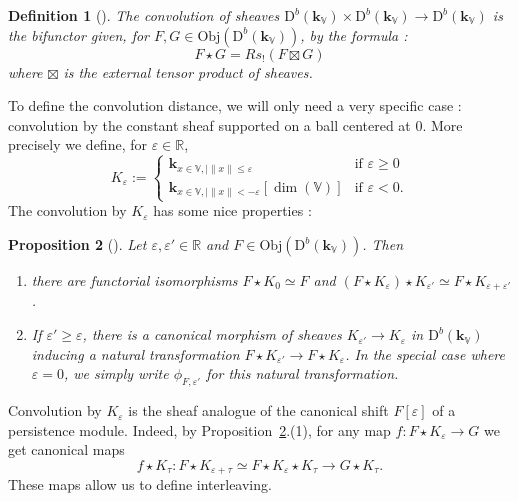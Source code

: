 \documentclass[a4paper, english, 11pt]{article}
\newcommand{\kk}[0]{\textbf{k}}
\newcommand{\0}{\vec{0}}
\newcommand{\R}[0]{\mathbb{R}}
\newcommand{\V}[0]{\mathbb{V}}
\newcommand{\D}[0]{\text{D}}
\newcommand{\Obj}[0]{\text{Obj}}
\newtheorem{prop}{Proposition}[section]
\newtheorem{defi}[prop]{Definition}
\begin{document}
\begin{defi}[\cite{KS18}]\label{D:Convolution} The convolution of sheaves  $\D^b(\kk_\V)\times \D^b(\kk_\V) \to \D^b(\kk_\V)$ is the bifunctor given, 
for $F,G\in \Obj(\D^b(\kk_\V))$,  by the formula : $$F\star G = R s_!(F\boxtimes G)$$ where $\boxtimes$ is the external tensor product of sheaves. 
\end{defi}
To define the convolution distance,  we will only need a very specific case :  convolution by the constant sheaf supported on a ball centered at 0. 
More precisely we define, for $\varepsilon \in \R$, 
\begin{equation}\label{eq:defKepsilon}
 K_\varepsilon :=  \left\{ \begin{array}{cc} 
 \kk_{x\in \V, \mid \|x\|\leq \varepsilon}  & \mbox{if } \varepsilon \geq 0 \\
 \kk_{x\in \V, \mid \|x\|< -\varepsilon}[\dim(\V)]  & \mbox{if } \varepsilon < 0 .\end{array} \right.
\end{equation}
The convolution by $K_\varepsilon$ has some nice properties : 
\begin{prop}[\cite{KS18}]\label{P:propertiesofconvolution} Let $\varepsilon, \varepsilon'\in \R$ and $F \in \Obj(\D^b(\kk_\V))$. Then
\begin{enumerate}
\item there are functorial isomorphisms $F\star K_0\simeq F$ and $(F\star K_{\varepsilon} )\star K_{\varepsilon'} \simeq F \star K_{\varepsilon + \varepsilon'} $.
\item If $\varepsilon' \geq \varepsilon $, there is a canonical morphism of sheaves 
$K_{\varepsilon'}\to K_{\varepsilon}$ in $\D^b(\kk_\V)$
inducing a natural transformation $F\star K_{\varepsilon'} \to F \star K_{\varepsilon} $. 
In the special case where $\varepsilon = 0$, we simply write $\phi_{F, \varepsilon'}$ for this natural transformation.
\end{enumerate}
\end{prop}
Convolution by $K_{\varepsilon}$ is the sheaf analogue of the canonical shift $F[\varepsilon]$ of a persistence module. Indeed, by
Proposition~\ref{P:propertiesofconvolution}.(1),  for any map $f: F\star K_{\varepsilon} \to G$ we get  canonical maps  
\begin{equation} \label{eq:propertiesofconvolution} f\star K_{\tau}: F\star K_{\varepsilon+\tau}\simeq F\star  K_{\varepsilon}\star K_{\tau}  \to G \star K_{\tau}.\end{equation} 
These  maps allow us to define interleaving.
\end{document}
